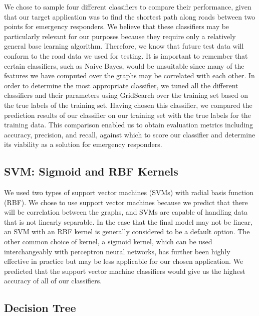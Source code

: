 \documentclass{article}
\begin{document}
We  chose to sample four different classifiers to compare their performance, given that our target application was to find the shortest path along roads between two points for emergency responders. We believe that these classifiers may be particularly relevant for our purposes because they require only a relatively general base learning algorithm. Therefore, we know that future test data will conform to the road data we used for testing. It is important to remember that certain classifiers, such as Naive Bayes, would be unsuitable since many of the features we have computed over the graphs may be correlated with each other. In order to determine the most appropriate classifier, we tuned all the different classifiers and their parameters using GridSearch over the training set based on the true labels of the training set. Having chosen this classifier, we compared the prediction results of our classifier on our training set with the true labels for the training data. This comparison enabled us to obtain evaluation metrics including accuracy, precision, and recall, against which to score our classifier and determine its viability as a solution for emergency responders.

\subsection{SVM: Sigmoid and RBF Kernels}

We used two types of support vector machines (SVMs) with radial basis function (RBF). We chose to use support vector machines because we predict that there will be correlation between the graphs, and SVMs are capable of handling data that is not linearly separable. In the case that the final model may not be linear, an SVM with an RBF kernel is generally considered to be a default option. The other common choice of kernel, a sigmoid kernel, which can be used interchangeably with perceptron neural networks, has further been highly effective in practice but may be less applicable for our chosen application. We predicted that the support vector machine classifiers would give us the highest accuracy of all of our classifiers.

\subsection{Decision Tree}
\end{document}
